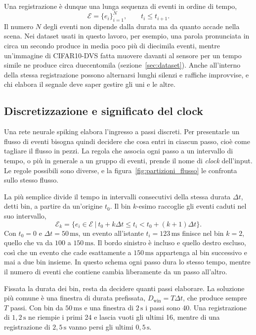 Una registrazione è dunque una lunga sequenza di eventi in ordine di tempo,
\begin{equation}
\label{eq:stream_completo}
\mathcal E=\{e_i\}_{i=1}^{N},\qquad t_i\leq t_{i+1}.
\end{equation}
Il numero $N$ degli eventi non dipende dalla durata ma da quanto accade nella scena. Nei dataset usati in questo lavoro, per esempio, una parola pronunciata in circa un secondo produce in media poco più di diecimila eventi, mentre un'immagine di CIFAR10-DVS fatta muovere davanti al sensore per un tempo simile ne produce circa duecentomila (sezione~\ref{sec:dataset}). Anche all'interno della stessa registrazione possono alternarsi lunghi silenzi e raffiche improvvise, e chi elabora il segnale deve saper gestire gli uni e le altre.

\subsection{Discretizzazione e significato del clock}
\label{subsec:discretizzazione_clock}

Una rete neurale spiking elabora l'ingresso a passi discreti. Per presentarle un flusso di eventi bisogna quindi decidere che cosa entri in ciascun passo, cioè come tagliare il flusso in pezzi. La regola che associa ogni passo a un intervallo di tempo, o più in generale a un gruppo di eventi, prende il nome di \emph{clock} dell'input. Le regole possibili sono diverse, e la figura~\ref{fig:partizioni_flusso} le confronta sullo stesso flusso.

La più semplice divide il tempo in intervalli consecutivi della stessa durata $\Delta t$, detti bin, a partire da un'origine $t_0$. Il bin $k$-esimo raccoglie gli eventi caduti nel suo intervallo,
\begin{equation}
\label{eq:finestre_fisse}
\mathcal E_k=\bigl\{e_i\in\mathcal E\ \big|\ t_0+k\Delta t\leq t_i<t_0+(k+1)\Delta t\bigr\}.
\end{equation}
Con $t_0=0$ e $\Delta t=50\,\mathrm{ms}$, un evento all'istante $t_i=123\,\mathrm{ms}$ finisce nel bin $k=2$, quello che va da $100$ a $150\,\mathrm{ms}$. Il bordo sinistro è incluso e quello destro escluso, così che un evento che cade esattamente a $150\,\mathrm{ms}$ appartenga al bin successivo e mai a due bin insieme. In questo schema ogni passo dura lo stesso tempo, mentre il numero di eventi che contiene cambia liberamente da un passo all'altro.

Fissata la durata dei bin, resta da decidere quanti passi elaborare. La soluzione più comune è una finestra di durata prefissata, $D_{\mathrm{win}}=T\Delta t$, che produce sempre $T$ passi. Con bin da $50\,\mathrm{ms}$ e una finestra di $2\,\mathrm{s}$ i passi sono 40. Una registrazione di $1{,}2\,\mathrm{s}$ ne riempie i primi 24 e lascia vuoti gli ultimi 16, mentre di una registrazione di $2{,}5\,\mathrm{s}$ vanno persi gli ultimi $0{,}5\,\mathrm{s}$.

